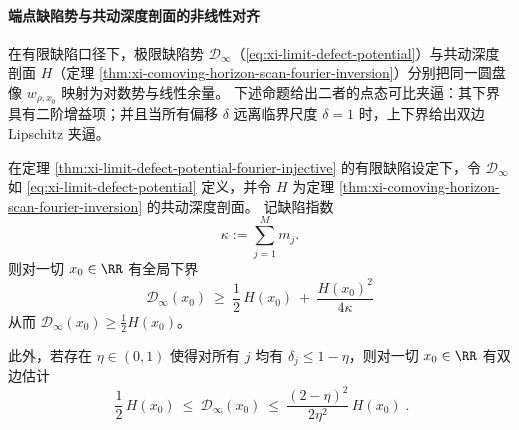 \paragraph{端点缺陷势与共动深度剖面的非线性对齐}\label{par:xi-limit-defect-potential-depth-profile-alignment}
在有限缺陷口径下，极限缺陷势 \(\mathcal{D}_\infty\)（\eqref{eq:xi-limit-defect-potential}）与共动深度剖面 \(H\)（定理 \ref{thm:xi-comoving-horizon-scan-fourier-inversion}）分别把同一圆盘像 \(w_{\rho,x_0}\) 映射为对数势与线性余量。
下述命题给出二者的点态可比夹逼：其下界具有二阶增益项；并且当所有偏移 \(\delta\) 远离临界尺度 \(\delta=1\) 时，上下界给出双边 Lipschitz 夹逼。

\begin{proposition}\label{prop:xi-limit-defect-potential-vs-depth-profile}
在定理 \ref{thm:xi-limit-defect-potential-fourier-injective} 的有限缺陷设定下，令 \(\mathcal{D}_\infty\) 如 \eqref{eq:xi-limit-defect-potential} 定义，并令 \(H\) 为定理 \ref{thm:xi-comoving-horizon-scan-fourier-inversion} 的共动深度剖面。
记缺陷指数
\[
\kappa:=\sum_{j=1}^{M}m_j.
\]
则对一切 \(x_0\in\RR\) 有全局下界
\begin{equation}\label{eq:xi-limit-defect-vs-depth-lb}
\boxed{\;
\mathcal{D}_\infty(x_0)\ \ge\ \frac12\,H(x_0)\ +\ \frac{H(x_0)^2}{4\kappa}\;}
\end{equation}
从而 \(\mathcal{D}_\infty(x_0)\ge \frac12H(x_0)\)。
\par
此外，若存在 \(\eta\in(0,1)\) 使得对所有 \(j\) 均有 \(\delta_j\le 1-\eta\)，则对一切 \(x_0\in\RR\) 有双边估计
\begin{equation}\label{eq:xi-limit-defect-vs-depth-bilipschitz}
\boxed{\;
\frac12\,H(x_0)\ \le\ \mathcal{D}_\infty(x_0)\ \le\ \frac{(2-\eta)^2}{2\eta^2}\,H(x_0)\; }.
\end{equation}
\end{proposition}

